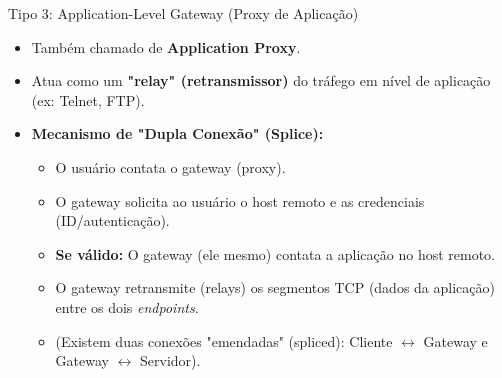 \begin{frame}{Tipo 3: Application-Level Gateway (Proxy de Aplicação)}
    \begin{itemize}
        \item Também chamado de \textbf{Application Proxy}.
        \item Atua como um \textbf{"relay" (retransmissor)} do tráfego em nível de aplicação (ex: Telnet, FTP).

        \item \textbf{Mecanismo de "Dupla Conexão" (Splice):}
              \begin{itemize}
                  \item O usuário contata o gateway (proxy).
                  \item O gateway solicita ao usuário o host remoto e as credenciais (ID/autenticação).
                  \item \textbf{Se válido:} O gateway (ele mesmo) contata a aplicação no host remoto.
                  \item O gateway retransmite (relays) os segmentos TCP (dados da aplicação) entre os dois \textit{endpoints}.
                  \item (Existem duas conexões "emendadas" (spliced): Cliente $\leftrightarrow$ Gateway e Gateway $\leftrightarrow$ Servidor).
              \end{itemize}
    \end{itemize}
\end{frame}

